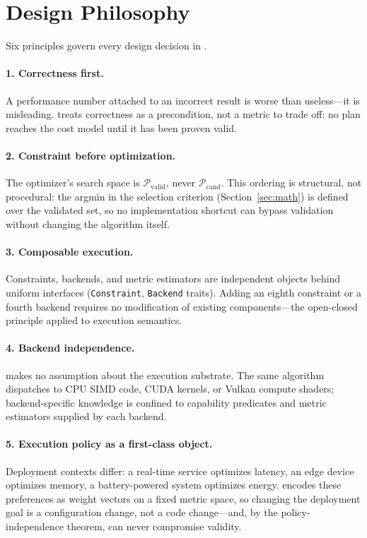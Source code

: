 \section{Design Philosophy}
\label{sec:design}

Six principles govern every design decision in \gate{}.

\paragraph{1. Correctness first.}
A performance number attached to an incorrect result is worse than
useless---it is misleading. \gate{} treats correctness as a
precondition, not a metric to trade off: no plan reaches the cost model
until it has been proven valid.

\paragraph{2. Constraint before optimization.}
The optimizer's search space is $\mathcal{P}_{\text{valid}}$, never
$\mathcal{P}_{\text{cand}}$. This ordering is structural, not
procedural: the argmin in the selection criterion
(Section~\ref{sec:math}) is defined over the validated set, so no
implementation shortcut can bypass validation without changing the
algorithm itself.

\paragraph{3. Composable execution.}
Constraints, backends, and metric estimators are independent objects
behind uniform interfaces (\texttt{Constraint}, \texttt{Backend} traits).
Adding an eighth constraint or a fourth backend requires no modification
of existing components---the open-closed principle applied to execution
semantics.

\paragraph{4. Backend independence.}
\gate{} makes no assumption about the execution substrate. The same
algorithm dispatches to CPU SIMD code, CUDA kernels, or Vulkan compute
shaders; backend-specific knowledge is confined to capability
predicates and metric estimators supplied by each backend.

\paragraph{5. Execution policy as a first-class object.}
Deployment contexts differ: a real-time service optimizes latency, an
edge device optimizes memory, a battery-powered system optimizes energy.
\gate{} encodes these preferences as weight vectors on a fixed metric
space, so changing the deployment goal is a configuration change, not a
code change---and, by the policy-independence theorem, can never
compromise validity.

